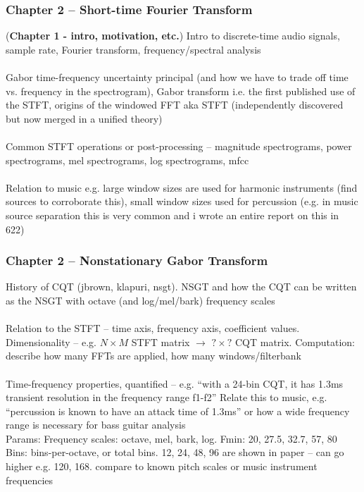 \documentclass[usenames,dvipsnames]{beamer}
\begin{document}
\begin{frame}
	\frametitle{Chapter 2 -- Short-time Fourier Transform}
	(\textbf{Chapter 1 - intro, motivation, etc.})
	Intro to discrete-time audio signals, sample rate, Fourier transform, frequency/spectral analysis\\\ \\
	Gabor time-frequency uncertainty principal (and how we have to trade off time vs. frequency in the spectrogram), Gabor transform i.e. the first published use of the STFT, origins of the windowed FFT aka STFT (independently discovered but now merged in a unified theory)\\\ \\
	Common STFT operations or post-processing -- magnitude spectrograms, power spectrograms, mel spectrograms, log spectrograms, mfcc\\\ \\
	Relation to music e.g. large window sizes are used for harmonic instruments (find sources to corroborate this), small window sizes used for percussion (e.g. in music source separation this is very common and i wrote an entire report on this in 622)
\end{frame}

\begin{frame}
	\frametitle{Chapter 2 -- Nonstationary Gabor Transform}
	History of CQT (jbrown, klapuri, nsgt). NSGT and how the CQT can be written as the NSGT with octave (and log/mel/bark) frequency scales\\\ \\
	Relation to the STFT -- time axis, frequency axis, coefficient values. Dimensionality -- e.g. $N \times M$  STFT matrix $\rightarrow$ $? \times ?$ CQT matrix. Computation: describe how many FFTs are applied, how many windows/filterbank\\\ \\
	Time-frequency properties, quantified -- e.g. ``with a 24-bin CQT, it has 1.3ms transient resolution in the frequency range f1-f2'' Relate this to music, e.g. ``percussion is known to have an attack time of 1.3ms'' or how a wide frequency range is necessary for bass guitar analysis\\
Params: Frequency scales: octave, mel, bark, log. Fmin: 20, 27.5, 32.7, 57, 80 Bins: bins-per-octave, or total bins. 12, 24, 48, 96 are shown in paper -- can go higher e.g. 120, 168. compare to known pitch scales or music instrument frequencies
\end{frame}
\end{document}
